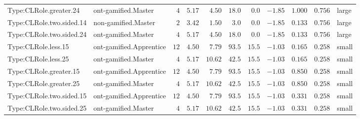 \documentclass[6pt,a4paper]{article}
\begin{document}
{\begin{longtable}{llrrrrrrrrl}
Type:CLRole.greater.24&ont-gamified.Master&$ 4$&$5.17$&$ 4.50$&$ 18.0$&$ 0.0$&$-1.85$&$1.000$&$0.756$&large\tabularnewline
Type:CLRole.two.sided.14&non-gamified.Master&$ 2$&$3.42$&$ 1.50$&$  3.0$&$ 0.0$&$-1.85$&$0.133$&$0.756$&large\tabularnewline
Type:CLRole.two.sided.24&ont-gamified.Master&$ 4$&$5.17$&$ 4.50$&$ 18.0$&$ 0.0$&$-1.85$&$0.133$&$0.756$&large\tabularnewline
Type:CLRole.less.15&ont-gamified.Apprentice&$12$&$4.50$&$ 7.79$&$ 93.5$&$15.5$&$-1.03$&$0.165$&$0.258$&small\tabularnewline
Type:CLRole.less.25&ont-gamified.Master&$ 4$&$5.17$&$10.62$&$ 42.5$&$15.5$&$-1.03$&$0.165$&$0.258$&small\tabularnewline
Type:CLRole.greater.15&ont-gamified.Apprentice&$12$&$4.50$&$ 7.79$&$ 93.5$&$15.5$&$-1.03$&$0.850$&$0.258$&small\tabularnewline
Type:CLRole.greater.25&ont-gamified.Master&$ 4$&$5.17$&$10.62$&$ 42.5$&$15.5$&$-1.03$&$0.850$&$0.258$&small\tabularnewline
\newpage
Type:CLRole.two.sided.15&ont-gamified.Apprentice&$12$&$4.50$&$ 7.79$&$ 93.5$&$15.5$&$-1.03$&$0.331$&$0.258$&small\tabularnewline
Type:CLRole.two.sided.25&ont-gamified.Master&$ 4$&$5.17$&$10.62$&$ 42.5$&$15.5$&$-1.03$&$0.331$&$0.258$&small\tabularnewline
\hline
\end{longtable}}
\end{document}
